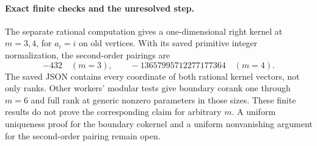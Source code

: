 \paragraph{Exact finite checks and the unresolved step.}
The separate rational computation
 gives a
one-dimensional right kernel at \(m=3,4\), for
\(a_i=i\) on old vertices. With its saved primitive
integer normalization, the second-order pairings are
\[
             -432\quad(m=3),\qquad
             -13657995712277177364\quad(m=4).
\]
The saved JSON contains every coordinate of both
rational kernel vectors, not only ranks.
Other workers' modular tests give boundary corank one
through \(m=6\) and full rank at generic nonzero
parameters in those sizes.
These finite results do not prove the corresponding
claim for arbitrary \(m\). A uniform uniqueness proof
for the boundary cokernel and a uniform nonvanishing
argument for the second-order pairing remain open.

